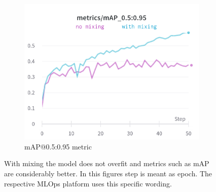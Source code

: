 \begin{figure}[!h]
\begin{subfigure}{0.33\textwidth}
  \includegraphics[width=\linewidth]{images/implementation/windowing/mixing/mixing_big_map}
  \caption{mAP@0.5:0.95 metric}
\end{subfigure}
\caption{With mixing the model does not overfit and metrics such as mAP are considerably better. In this figures step is meant as epoch. The respective MLOps platform uses this specific wording.}
\label{impl:mixing}
\end{figure}


